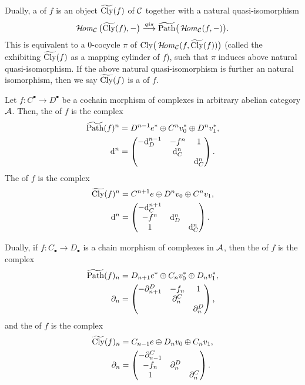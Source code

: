 {Dually, a  of $f$ 
is an object $\widetilde{\mathrm{Cly}}(f)$ of ${\cal C}$ together with 
a natural quasi-isomorphism 
\[
\operatorname{\mathcal{H}\!\mathit{om}}_{{\cal C}}\big(\widetilde{\mathrm{Cly}}(f),-\big)\stackrel{{qis}}{\longrightarrow} 
\widetilde{\mathrm{Path}}\big(\operatorname{\mathcal{H}\!\mathit{om}}_{{\cal C}}(f,-)\big).
\]
This is equivalent to a $0$-cocycle $\pi$ of 
$\mathrm{Cly}\big(\operatorname{\mathcal{H}\!\mathit{om}}_{{\cal C}}(f,\widetilde{\mathrm{Cly}}(f))\big)$ 
(called the  
exhibiting $\widetilde{\mathrm{Cly}}(f)$ as a mapping cylinder of $f$),
such that $\pi$ induces above natural quasi-isomorphism. 
If the above natural quasi-isomorphism is further an 
natural isomorphism, then we say $\widetilde{\mathrm{Cly}}(f)$ is 
a  of $f$.

Let $f\colon C^{\bullet}\to D^{\bullet}$ 
be a cochain morphism of complexes in arbitrary 
abelian category ${\cal A}$. 
Then, the  of $f$ 
is the complex 
\begin{align*}
\widetilde{\mathrm{Path}}(f)^n &= 
D^{n-1}e^{\ast}\oplus C^nv_0^{\ast}\oplus D^nv_1^{\ast}, \\
\mathrm{d}^n &= 
\begin{pmatrix}
-\mathrm{d}_D^{n-1} & -f^n & 1 \\
 & \mathrm{d}_C^n & \\
 &  & \mathrm{d}_C^n
\end{pmatrix}.
\end{align*}
The  of $f$ 
is the complex 
\begin{align*}
\widetilde{\mathrm{Cly}}(f)^n &= 
C^{n+1}e\oplus D^nv_0\oplus C^nv_1, \\
\mathrm{d}^n &= 
\begin{pmatrix}
-\mathrm{d}_C^{n+1} & & \\
-f^n & \mathrm{d}_D^n & \\
1 &  & \mathrm{d}_C^n
\end{pmatrix}.
\end{align*}

Dually, if $f\colon C_{\bullet}\to D_{\bullet}$ 
is a chain morphism of complexes in ${\cal A}$, then 
the  of $f$ 
is the complex 
\begin{align*}
\widetilde{\mathrm{Path}}(f)_n &= 
D_{n+1}e^{\ast}\oplus C_nv_0^{\ast}\oplus D_nv_1^{\ast}, \\
\partial_n &= 
\begin{pmatrix}
-\partial^D_{n+1} & -f_n & 1 \\
 & \partial^C_n & \\
 &  & \partial^D_n
\end{pmatrix},
\end{align*}
and the  of $f$ 
is the complex 
\begin{align*}
\widetilde{\mathrm{Cly}}(f)_n &= 
C_{n-1}e\oplus D_nv_0\oplus C_nv_1, \\
\partial_n &= 
\begin{pmatrix}
-\partial^C_{n-1} & & \\
-f_n & \partial^D_n & \\
1 &  & \partial^C_n
\end{pmatrix}.
\end{align*}

}

